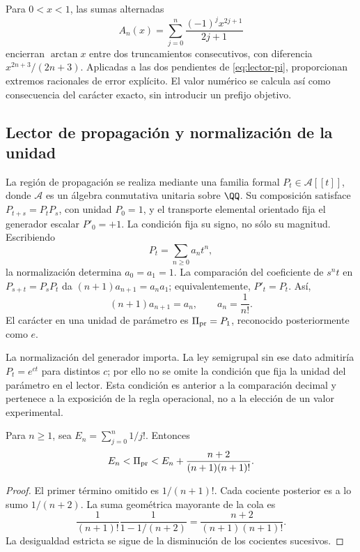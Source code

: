 Para \(0<x<1\), las sumas alternadas
\[
 A_n(x)=\sum_{j=0}^n\frac{(-1)^jx^{2j+1}}{2j+1}
\]
encierran \(\arctan x\) entre dos truncamientos consecutivos, con diferencia \(x^{2n+3}/(2n+3)\). Aplicadas a las dos pendientes de \eqref{eq:lector-pi}, proporcionan extremos racionales de error explícito. El valor numérico se calcula así como consecuencia del carácter exacto, sin introducir un prefijo objetivo.

\subsection{Lector de propagación y normalización de la unidad}

La región de propagación se realiza mediante una familia formal \(P_t\in\mathcal A[[t]]\), donde \(\mathcal A\) es un álgebra conmutativa unitaria sobre \(\QQ\). Su composición satisface \(P_{t+s}=P_tP_s\), con unidad \(P_0=1\), y el transporte elemental orientado fija el generador escalar \(P'_0=+1\). La condición fija su signo, no sólo su magnitud. Escribiendo
\[
 P_t=\sum_{n\ge0}a_nt^n,
\]
la normalización determina \(a_0=a_1=1\). La comparación del coeficiente de \(s^nt\) en \(P_{s+t}=P_sP_t\) da \((n+1)a_{n+1}=a_na_1\); equivalentemente, \(P'_t=P_t\). Así,
\begin{equation}
 (n+1)a_{n+1}=a_n,\qquad a_n=\frac1{n!}.
 \label{eq:propagacion}
\end{equation}
El carácter en una unidad de parámetro es \(\Pi_{\rm pr}=P_1\), reconocido posteriormente como \(e\).

La normalización del generador importa. La ley semigrupal sin ese dato admitiría \(P_t=e^{ct}\) para distintos \(c\); por ello no se omite la condición que fija la unidad del parámetro en el lector. Esta condición es anterior a la comparación decimal y pertenece a la exposición de la regla operacional, no a la elección de un valor experimental.

\begin{proposition}
Para \(n\ge1\), sea \(E_n=\sum_{j=0}^n1/j!\). Entonces
\[
 E_n<\Pi_{\rm pr}<E_n+\frac{n+2}{(n+1)(n+1)!}.
\]
\end{proposition}
\begin{proof}
El primer término omitido es \(1/(n+1)!\). Cada cociente posterior es a lo sumo \(1/(n+2)\). La suma geométrica mayorante de la cola es
\[
 \frac1{(n+1)!}\frac1{1-1/(n+2)}
 =\frac{n+2}{(n+1)(n+1)!}.
\]
La desigualdad estricta se sigue de la disminución de los cocientes sucesivos.
\end{proof}

